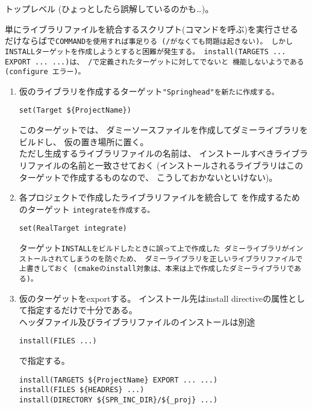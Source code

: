 \begin{Description}{トップレベル}
	\medskip
	(ひょっとしたら誤解しているのかも…)。

	単にライブラリファイルを統合するスクリプト(コマンドを呼ぶ)を実行させる
	だけならばで\tt{COMMAND}を使用すれば事足りる
	(/がなくても問題は起きない)。
	しかし\tt{INSTALL}ターゲットを作成しようとすると困難が発生する。
	\tt{install(TARGETS ... EXPORT ... ...)}は、
	/で定義されたターゲットに対してでないと
	機能しないようである(configure エラー)。

	\medskip
	\medskip

	\begin{enumerate}
	  \item	仮のライブラリを作成するターゲット\tt{"Springhead"}を新たに作成する。
		\begin{narrow}
			\tt{set(Target \$\{ProjectName\})}
		\end{narrow}
		このターゲットでは、
		ダミーソースファイルを作成してダミーライブラリをビルドし、
		仮の置き場所に置く。\\
		ただし生成するライブラリファイルの名前は、
		インストールすべきライブラリファイルの名前と一致させておく
		(インストールされるライブラリはこのターゲットで作成するものなので、
		こうしておかないといけない)。

	  \item	各プロジェクトで作成したライブラリファイルを統合して
		を作成するためのターゲット
		\tt{integrate}を作成する。
		\begin{narrow}
			\tt{set(RealTarget integrate)}
		\end{narrow}
		ターゲット\tt{INSTALL}をビルドしたときに誤って上で作成した
		ダミーライブラリがインストールされてしまうのを防ぐため、
		ダミーライブラリを正しいライブラリファイルで上書きしておく
		(cmakeのinstall対象は、本来は上で作成したダミーライブラリである)。

	  \item	仮のターゲットをexportする。
		インストール先はinstall directiveの属性として指定するだけで十分である。\\
		ヘッダファイル及びライブラリファイルのインストールは別途
		\begin{narrow}
			\tt{install(FILES ...) }
		\end{narrow}
		で指定する。
		\begin{narrow}
			\tt{install(TARGETS \$\{ProjectName\} EXPORT ... ...)}\\
			\tt{install(FILES \$\{HEADRES\} ...)}\\
			\tt{install(DIRECTORY \$\{SPR\_INC\_DIR\}/\$\{\_proj\} ...)}
		\end{narrow}
	\end{enumerate}
\end{Description}


